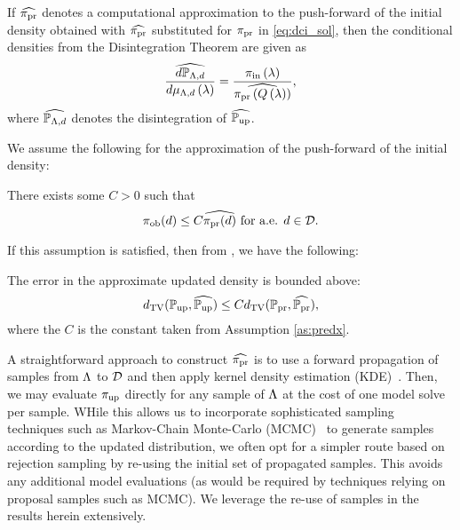 
If $\widehat{\operatorname*{\pi_{pr}}}$ denotes a computational approximation to the push-forward of the initial density obtained with $\widehat{\operatorname*{\pi_{pr}}}$ substituted for $\operatorname*{\pi_{pr}}$ in \eqref{eq:dci_sol}, then the conditional densities from the Disintegration Theorem are given as
\[
\frac{\widehat{d\mathbb{P}_{{\Lambda}, d}}}{d\mu_{{\Lambda}, d}\left ( \lambda \right )} = \frac{\operatorname*{\pi_{in}}\left ( \lambda \right )}{ \widehat{\operatorname*{\pi_{pr}}\left ( Q\left ( \lambda \right ) \right )} },
\]
where $\widehat{\mathbb{P}_{{\Lambda}, d}}$ denotes the disintegration of $\widehat{\operatorname*{\mathbb{P}_{up}}}$.


We assume the following for the approximation of the push-forward of the initial density:
\begin{assumption}\label{as:predx}
There exists some $C>0$ such that
\[
\operatorname*{\pi_{ob}} (d) \leq C \widehat{\operatorname*{\pi_{pr}}(d)} \text{ for a.e. } d\in \mathcal{D}.
\]
\end{assumption}

If this assumption is satisfied, then from \cite{BJW18}, we have the following:
\begin{thm}\label{thm:predicted_bound}
  The error in the approximate updated density is bounded above:
  \begin{equation}\label{eq:predicted_bound}
    d_{\text{TV}} (\operatorname*{\mathbb{P}_{up}}, \widehat{\operatorname*{\mathbb{P}_{up}}}) \leq C d_{\text{TV}} (\operatorname*{\mathbb{P}_{pr}}, \widehat{\operatorname*{\mathbb{P}_{pr}}}),
  \end{equation}
  where the $C$ is the constant taken from Assumption \ref{as:predx}.
\end{thm}

A straightforward approach to construct $\widehat{\operatorname*{\pi_{pr}}}$ is to use a forward propagation of samples from ${\Lambda}$ to $\mathcal{D}$ and then apply kernel density estimation (KDE)~\cite{BJW18}.
Then, we may evaluate $\operatorname*{\pi_{up}}$ directly for any sample of ${\Lambda}$ at the cost of one model solve per sample.
WHile this allows us to incorporate sophisticated sampling techniques such as Markov-Chain Monte-Carlo (MCMC)~\cite{Smith, Tarantola_book} to generate samples according to the updated distribution, we often opt for a simpler route based on rejection sampling by re-using the initial set of propagated samples.
This avoids any additional model evaluations (as would be required by techniques relying on proposal samples such as MCMC).
We leverage the re-use of samples in the results herein extensively.

